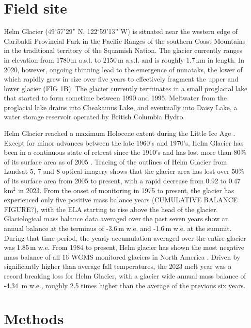 \documentclass[annals,twocolumn,letterpaper]{igs.cls}
\begin{document}
\section{Field site}

Helm Glacier (49$^{\circ}$57’29” N, 122$^{\circ}$59’13” W) is situated near the western edge of Garibaldi Provincial Park in the Pacific Ranges of the southern Coast Mountains in the traditional territory of the Squamish Nation. The glacier currently ranges in elevation from 1780\,m a.s.l. to 2150\,m a.s.l. and is roughly 1.7\,km in length. In 2020, however, ongoing thinning lead to the emergence of nunataks, the lower of which rapidly grew in size over five years to effectively fragment the upper and lower glacier (FIG 1B). The glacier currently terminates in a small proglacial lake that started to form sometime between 1990 and 1995. Meltwater from the proglacial lake drains into Cheakamus Lake, and eventually into Daisy Lake, a water storage reservoir operated by British Columbia Hydro. 

Helm Glacier reached a maximum Holocene extent during the Little Ice Age \citep{Ryder1986}.  Except for minor advances between the late 1960’s and 1970’s, Helm Glacier has been in a continuous state of retreat since the 1910’s and has lost more than 80\% of its surface area as of 2005 \citep{Koch2009}. Tracing of the outlines of Helm Glacier from Landsat 5, 7 and 8 optical imagery shows that the glacier area has lost over 50\% of its surface area from 2005 to present, with a rapid decrease from 0.92 to 0.47\,km$^2$ in 2023. From the onset of monitoring in 1975 to present, the glacier has experienced only five positive mass balance years (CUMULATIVE BALANCE FIGURE?), with the ELA starting to rise above the head of the glacier. Glaciological mass balance data averaged over the past seven years show an annual balance at the terminus of -3.6\,m w.e. and -1.6\,m w.e. at the summit. During that time period, the yearly accumulation averaged over the entire glacier was 1.85\,m w.e. From 1984 to present, Helm glacier has shown the most negative mass balance of all 16 WGMS monitored glaciers in North America \citep{WGMS2024}. Driven by significantly higher than average fall temperatures, the 2023 melt year was a record breaking loss for Helm Glacier, with a glacier wide annual mass balance of -4.34\, m w.e., roughly 2.5 times higher than the average of the previous six years. 

\section{Methods}
\end{document}
